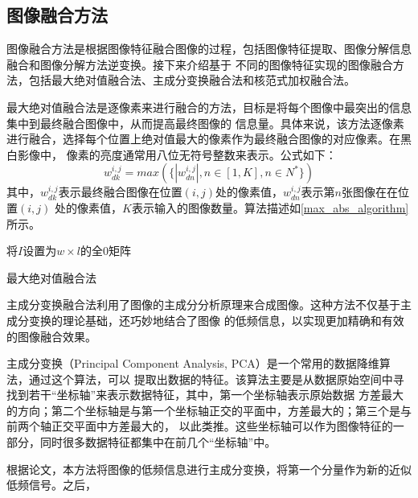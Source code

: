 \documentclass{xduugthesis}
\begin{document}
\subsection{图像融合方法}
图像融合方法是根据图像特征融合图像的过程，包括图像特征提取、图像分解信息融合和图像分解方法逆变换。接下来介绍基于
不同的图像特征实现的图像融合方法，包括最大绝对值融合法、主成分变换融合法和核范式加权融合法。\par
最大绝对值融合法是逐像素来进行融合的方法，目标是将每个图像中最突出的信息集中到最终融合图像中，从而提高最终图像的
信息量。具体来说，该方法逐像素进行融合，选择每个位置上绝对值最大的像素作为最终融合图像的对应像素。在黑白影像中，
像素的亮度通常用八位无符号整数来表示。公式如下：
\begin{equation}w_{dk}^{i,j}=max\left(\{\left|w_{dn}^{i,j}\right|,n\in\left[1,K\right],n\in N^\ast\}\right)\end{equation}
其中，$w_{dk}^{i,j}$表示最终融合图像在位置$(i,j)$处的像素值，$w_{dn}^{i,j}$表示第$n$张图像在在位置$(i,j)$
处的像素值，$K$表示输入的图像数量。算法描述如\ref{max_abs_algorithm}所示。\par
\IncMargin{2em}
\begin{algorithm}[H]
	将$I$设置为$w\times l$的全0矩阵\;
	\caption{最大绝对值融合法}\label{max_abs_algorithm}
\end{algorithm}
\DecMargin{2em}
主成分变换融合法利用了图像的主成分分析原理来合成图像。这种方法不仅基于主成分变换的理论基础，还巧妙地结合了图像
的低频信息，以实现更加精确和有效的图像融合效果。\par
主成分变换（Principal Component Analysis, PCA）是一个常用的数据降维算法\cite{PCA}，通过这个算法，可以
提取出数据的特征。该算法主要是从数据原始空间中寻找到若干“坐标轴”来表示数据特征，其中，第一个坐标轴表示原始数据
方差最大的方向；第二个坐标轴是与第一个坐标轴正交的平面中，方差最大的；第三个是与前两个轴正交平面中方差最大的，
以此类推。这些坐标轴可以作为图像特征的一部分，同时很多数据特征都集中在前几个“坐标轴”中。\par
根据论文\parencite{PCA_Merge}，本方法将图像的低频信息进行主成分变换，将第一个分量作为新的近似低频信号。之后，
\end{document}
